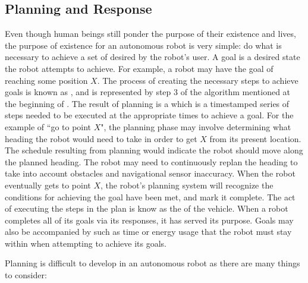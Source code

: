 \subsection{Planning and Response}
Even though human beings still ponder the purpose of their existence and lives, the purpose of existence for an autonomous robot is very simple: do what is necessary to achieve a set of  desired by the robot's user. A goal is a desired state the robot attempts to achieve. For example, a robot may have the goal of reaching some position $X$. The process of creating the necessary steps to achieve goals is known as , and is represented by step 3 of the algorithm mentioned at the beginning of . The result of planning is a  which is a timestamped series of steps needed to be executed at the appropriate times to achieve a goal. For the example of ``go to point $X$", the planning phase may involve determining what heading the robot would need to take in order to get $X$ from its present location. The schedule resulting from planning would indicate the robot should move along the planned heading. The robot may need to continuously replan the heading to take into account obstacles and navigational sensor inaccuracy. When the robot eventually gets to point $X$, the robot's planning system will recognize the conditions for achieving the goal have been met, and mark it complete. The act of executing the steps in the plan is know as the  of the vehicle. When a robot completes all of its goals via its responses, it has served its purpose. Goals may also be accompanied by  such as time or energy usage that the robot must stay within when attempting to achieve its goals.

Planning is difficult to develop in an autonomous robot as there are many things to consider:


